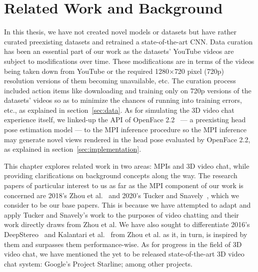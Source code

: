 \chapter{Related Work and Background}\label{ch2:related-work-background}

In this thesis, we have not created novel models or datasets but have rather curated preexisting datasets and retrained a state-of-the-art CNN. Data curation has been an essential part of our work as the datasets' YouTube videos are subject to modifications over time. These modifications are in terms of the videos being taken down from YouTube or the required 1280$\times$720 pixel (720p) resolution versions of them becoming unavailable, etc. The curation process included action items like downloading and training only on 720p versions of the datasets' videos so as to minimize the chances of running into training errors, etc., as explained in section~\ref{sec:data}. As for simulating the 3D video chat experience itself, we linked-up the API of OpenFace 2.2~\cite{baltrusaitis_openface_2018} --- a preexisting head pose estimation model --- to the MPI inference procedure so the MPI inference may generate novel views rendered in the head pose evaluated by OpenFace 2.2, as explained in section~\ref{sec:implementation}.

This chapter explores related work in two areas: MPIs and 3D video chat, while providing clarifications on background concepts along the way. The research papers of particular interest to us as far as the MPI component of our work is concerned are 2018's Zhou et al.~\cite{zhou2018stereo} and 2020's Tucker and Snavely~\cite{single_view_mpi}, which we consider to be our base papers. This is because we have attempted to adapt and apply Tucker and Snavely's work to the purposes of video chatting and their work directly draws from Zhou et al. We have also sought to differentiate 2016's DeepStereo~\cite{deep_stereo_2016} and Kalantari et al.~\cite{kalantari_2016} from Zhou et al. as it, in turn, is inspired by them and surpasses them performance-wise. As for progress in the field of 3D video chat, we have mentioned the yet to be released state-of-the-art 3D video chat system: Google's Project Starline; among other projects.


% 